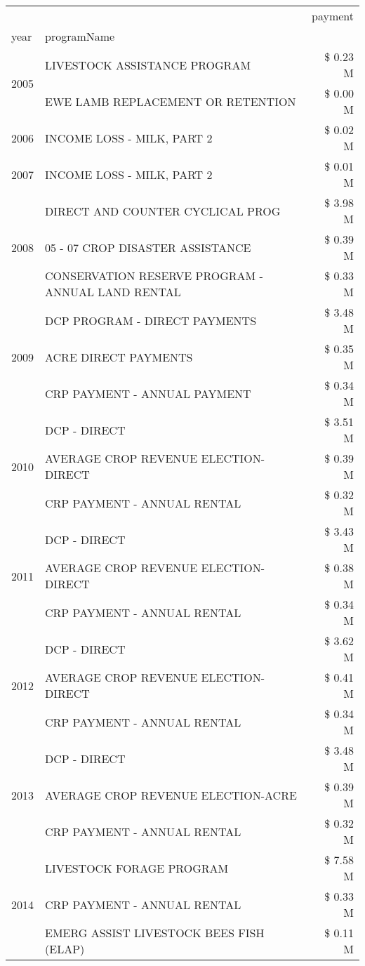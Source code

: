 \begin{tabular}{llr}
\toprule
 &  & payment \\
year & programName &  \\
\midrule
\multirow[t]{2}{*}{2005} & LIVESTOCK ASSISTANCE PROGRAM & \$ 0.23 M \\
 & EWE LAMB REPLACEMENT OR RETENTION & \$ 0.00 M \\
\cline{1-3}
2006 & INCOME LOSS - MILK, PART 2 & \$ 0.02 M \\
\cline{1-3}
2007 & INCOME LOSS - MILK, PART 2 & \$ 0.01 M \\
\cline{1-3}
\multirow[t]{3}{*}{2008} & DIRECT AND COUNTER CYCLICAL PROG & \$ 3.98 M \\
 & 05 - 07 CROP DISASTER ASSISTANCE & \$ 0.39 M \\
 & CONSERVATION RESERVE PROGRAM - ANNUAL LAND RENTAL & \$ 0.33 M \\
\cline{1-3}
\multirow[t]{3}{*}{2009} & DCP PROGRAM - DIRECT PAYMENTS & \$ 3.48 M \\
 & ACRE DIRECT PAYMENTS & \$ 0.35 M \\
 & CRP PAYMENT - ANNUAL PAYMENT & \$ 0.34 M \\
\cline{1-3}
\multirow[t]{3}{*}{2010} & DCP - DIRECT & \$ 3.51 M \\
 & AVERAGE CROP REVENUE ELECTION-DIRECT & \$ 0.39 M \\
 & CRP PAYMENT - ANNUAL RENTAL & \$ 0.32 M \\
\cline{1-3}
\multirow[t]{3}{*}{2011} & DCP - DIRECT & \$ 3.43 M \\
 & AVERAGE CROP REVENUE ELECTION-DIRECT & \$ 0.38 M \\
 & CRP PAYMENT - ANNUAL RENTAL & \$ 0.34 M \\
\cline{1-3}
\multirow[t]{3}{*}{2012} & DCP - DIRECT & \$ 3.62 M \\
 & AVERAGE CROP REVENUE ELECTION-DIRECT & \$ 0.41 M \\
 & CRP PAYMENT - ANNUAL RENTAL & \$ 0.34 M \\
\cline{1-3}
\multirow[t]{3}{*}{2013} & DCP - DIRECT & \$ 3.48 M \\
 & AVERAGE CROP REVENUE ELECTION-ACRE & \$ 0.39 M \\
 & CRP PAYMENT - ANNUAL RENTAL & \$ 0.32 M \\
\cline{1-3}
\multirow[t]{3}{*}{2014} & LIVESTOCK FORAGE PROGRAM & \$ 7.58 M \\
 & CRP PAYMENT - ANNUAL RENTAL & \$ 0.33 M \\
 & EMERG ASSIST LIVESTOCK BEES FISH (ELAP) & \$ 0.11 M \\

\end{tabular}
